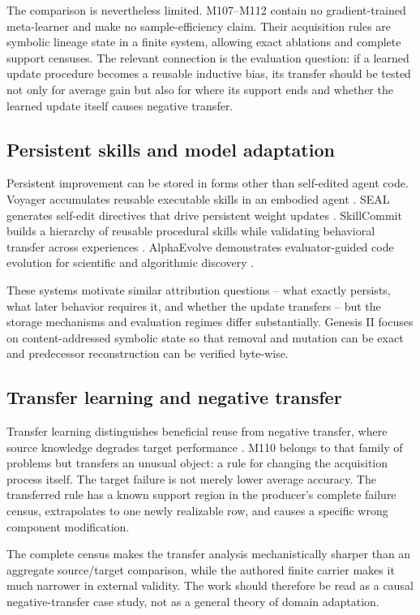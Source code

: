The comparison is nevertheless limited. M107--M112 contain no gradient-trained meta-learner and make no sample-efficiency claim. Their acquisition rules are symbolic lineage state in a finite system, allowing exact ablations and complete support censuses. The relevant connection is the evaluation question: if a learned update procedure becomes a reusable inductive bias, its transfer should be tested not only for average gain but also for where its support ends and whether the learned update itself causes negative transfer.

\subsection{Persistent skills and model adaptation}
Persistent improvement can be stored in forms other than self-edited agent code. Voyager accumulates reusable executable skills in an embodied agent \cite{wang2023voyager}. SEAL generates self-edit directives that drive persistent weight updates \cite{zweiger2025seal}. SkillCommit builds a hierarchy of reusable procedural skills while validating behavioral transfer across experiences \cite{he2026skillcommit}. AlphaEvolve demonstrates evaluator-guided code evolution for scientific and algorithmic discovery \cite{novikov2025alphaevolve}.

These systems motivate similar attribution questions -- what exactly persists, what later behavior requires it, and whether the update transfers -- but the storage mechanisms and evaluation regimes differ substantially. Genesis II focuses on content-addressed symbolic state so that removal and mutation can be exact and predecessor reconstruction can be verified byte-wise.

\subsection{Transfer learning and negative transfer}
Transfer learning distinguishes beneficial reuse from negative transfer, where source knowledge degrades target performance \cite{rosenstein2005transfer,pan2010transfer,wang2019negative,zhang2020negative}. M110 belongs to that family of problems but transfers an unusual object: a rule for changing the acquisition process itself. The target failure is not merely lower average accuracy. The transferred rule has a known support region in the producer's complete failure census, extrapolates to one newly realizable row, and causes a specific wrong component modification.

The complete census makes the transfer analysis mechanistically sharper than an aggregate source/target comparison, while the authored finite carrier makes it much narrower in external validity. The work should therefore be read as a causal negative-transfer case study, not as a general theory of domain adaptation.

